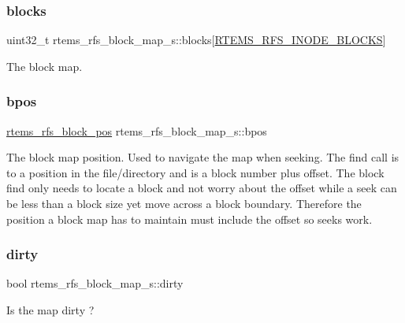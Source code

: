 \subsubsection{\texorpdfstring{blocks}{blocks}}
{\footnotesize\ttfamily uint32\+\_\+t rtems\+\_\+rfs\+\_\+block\+\_\+map\+\_\+s\+::blocks\mbox{[}\mbox{\hyperlink{rtems-rfs-file-system_8h_a89ff31e716c58b51c65d688662acb012}{R\+T\+E\+M\+S\+\_\+\+R\+F\+S\+\_\+\+I\+N\+O\+D\+E\+\_\+\+B\+L\+O\+C\+KS}}\mbox{]}}

The block map. \mbox{\label{structrtems__rfs__block__map__s_a5699833603dca58333e9d7f92d60cb86}} 
\subsubsection{\texorpdfstring{bpos}{bpos}}
{\footnotesize\ttfamily \mbox{\hyperlink{rtems-rfs-block-pos_8h_a0d8bd7482333e584a03df45e60cda226}{rtems\+\_\+rfs\+\_\+block\+\_\+pos}} rtems\+\_\+rfs\+\_\+block\+\_\+map\+\_\+s\+::bpos}

The block map position. Used to navigate the map when seeking. The find call is to a position in the file/directory and is a block number plus offset. The block find only needs to locate a block and not worry about the offset while a seek can be less than a block size yet move across a block boundary. Therefore the position a block map has to maintain must include the offset so seeks work. \mbox{\label{structrtems__rfs__block__map__s_aa99bf6b6620b00c0bdd84a8703275437}} 
\subsubsection{\texorpdfstring{dirty}{dirty}}
{\footnotesize\ttfamily bool rtems\+\_\+rfs\+\_\+block\+\_\+map\+\_\+s\+::dirty}

Is the map dirty ? \mbox{\label{structrtems__rfs__block__map__s_aef2105d20cc64f7465a68a9c98c40413}} 
